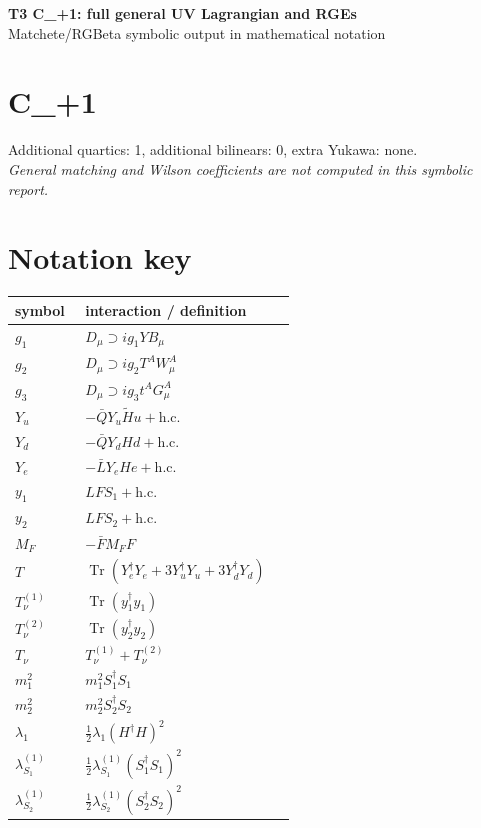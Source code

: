 \documentclass[10pt,a4paper]{article}
\begin{document}
\begin{center}
{\Large\bfseries T3 C\_+1: full general UV Lagrangian and RGEs}\\[4pt]
Matchete/RGBeta symbolic output in mathematical notation
\end{center}
\bigskip
\section*{C\_+1}
Additional quartics: 1, additional bilinears: 0, extra Yukawa: none.\\
\emph{General matching and Wilson coefficients are not computed in this symbolic report.}
\section*{Notation key}
\begin{longtable}{@{}p{0.23\linewidth}p{0.69\linewidth}@{}}
\toprule
symbol & interaction / definition \\
\midrule
$g_1$ & $D_\mu\supset i g_1YB_\mu$ \\
$g_2$ & $D_\mu\supset i g_2T^AW_\mu^A$ \\
$g_3$ & $D_\mu\supset i g_3t^AG_\mu^A$ \\
$Y_u$ & $-\bar QY_u\widetilde Hu+\mathrm{h.c.}$ \\
$Y_d$ & $-\bar QY_dHd+\mathrm{h.c.}$ \\
$Y_e$ & $-\bar LY_eHe+\mathrm{h.c.}$ \\
$y_1$ & $LFS_1+\mathrm{h.c.}$ \\
$y_2$ & $LFS_2+\mathrm{h.c.}$ \\
$M_F$ & $-\bar FM_FF$ \\
$T$ & $\operatorname{Tr}(Y_e^\dagger Y_e+3Y_u^\dagger Y_u+3Y_d^\dagger Y_d)$ \\
$T_\nu^{(1)}$ & $\operatorname{Tr}(y_1^\dagger y_1)$ \\
$T_\nu^{(2)}$ & $\operatorname{Tr}(y_2^\dagger y_2)$ \\
$T_\nu$ & $T_\nu^{(1)}+T_\nu^{(2)}$ \\
$m_1^2$ & $m_1^2S_1^\dagger S_1$ \\
$m_2^2$ & $m_2^2S_2^\dagger S_2$ \\
$\lambda_1$ & $\frac12\lambda_1(H^\dagger H)^2$ \\
$\lambda_{S_1}^{(1)}$ & $\frac12\lambda_{S_1}^{(1)}(S_1^\dagger S_1)^2$ \\
$\lambda_{S_2}^{(1)}$ & $\frac12\lambda_{S_2}^{(1)}(S_2^\dagger S_2)^2$ \\

\end{longtable}
\end{document}
